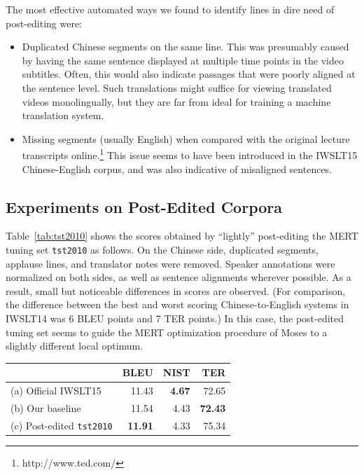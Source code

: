 {The most effective automated ways we found to identify lines in dire need of post-editing were:
\begin{itemize}
\item 
Duplicated Chinese segments on the same line. 
This was presumably caused by having the same sentence displayed at multiple time points in the video subtitles. 
Often, this would also indicate passages that were poorly aligned at the sentence level.
Such translations might suffice for viewing translated videos monolingually, but they are far from ideal for training a machine translation system.

\item 
Missing segments (usually English) when compared with the original lecture transcripts online.\footnote{http://www.ted.com/} 
This issue seems to have been introduced in the IWSLT15 Chinese-English corpus, and was also indicative of misaligned sentences.
\end{itemize}



\subsection{Experiments on Post-Edited Corpora}
\label{subsec:post_edited}

Table~\ref{tab:tst2010} shows the scores obtained by ``lightly'' post-editing the MERT tuning set {\small \tt tst2010} as follows. 
On the Chinese side, duplicated segments, applause lines, and translator notes were removed. 
Speaker annotations were normalized on both sides, as well as sentence alignments wherever possible.
As a result, small but noticeable differences in scores are observed. 
(For comparison, the difference between the best and worst scoring Chinese-to-English systems in IWSLT14  was 6 BLEU points and 7 TER points.)
In this case, the post-edited tuning set seems to guide the MERT optimization procedure of Moses to a slightly different local optimum.

\begin{table}[ht]
\centering
\begin{tabular}{|l|r|r|r|}
\hline
                    & BLEU  & NIST & TER    \\ \hline
(a) Official IWSLT15    & 11.43 & \textbf{4.67} & 72.65  \\ \hline
(b) Our baseline        & 11.54 & 4.43 & \textbf{72.43} \\ \hline
(c) Post-edited {\small \tt tst2010} & \textbf{11.91} & 4.33 & 75.34 \\ \hline
\end{tabular}


\end{table}}
